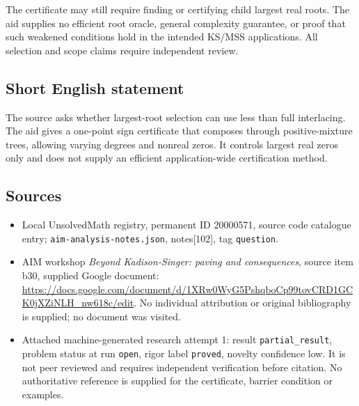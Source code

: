 \documentclass[11pt]{article}
\begin{document}
The certificate may still require finding or certifying child largest real roots. The aid supplies no efficient root oracle, general complexity guarantee, or proof that such weakened conditions hold in the intended KS/MSS applications. All selection and scope claims require independent review.
\subsection{Short English statement}
The source asks whether largest-root selection can use less than full interlacing. The aid gives a one-point sign certificate that composes through positive-mixture trees, allowing varying degrees and nonreal zeros. It controls largest real zeros only and does not supply an efficient application-wide certification method.
\subsection{Sources}
\begin{itemize}
\item Local UnsolvedMath registry, permanent ID 20000571, source code catalogue entry; \texttt{aim-analysis-notes.json}, notes[102], tag \texttt{question}.
\item AIM workshop \emph{Beyond Kadison-Singer: paving and consequences}, source item b30, supplied Google document: \url{https://docs.google.com/document/d/1XRw0WyG5PshqboCp99tovCRD1GCK0jXZiNLH_nw618c/edit}. No individual attribution or original bibliography is supplied; no document was visited.
\item Attached machine-generated research attempt 1: result \texttt{partial\_result}, problem status at run \texttt{open}, rigor label \texttt{proved}, novelty confidence low. It is not peer reviewed and requires independent verification before citation. No authoritative reference is supplied for the certificate, barrier condition or examples.
\end{itemize}
\end{document}
